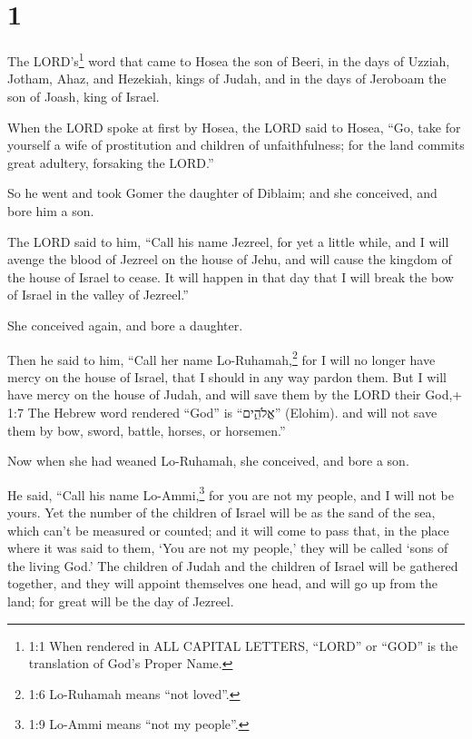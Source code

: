 \hypertarget{section}{%
\section{1}\label{section}}

 The LORD's\footnote{1:1 When rendered in ALL CAPITAL
  LETTERS, ``LORD'' or ``GOD'' is the translation of God's Proper Name.}
word that came to Hosea the son of Beeri, in the days of Uzziah, Jotham,
Ahaz, and Hezekiah, kings of Judah, and in the days of Jeroboam the son
of Joash, king of Israel.

 When the LORD spoke at first by Hosea, the LORD said to
Hosea, ``Go, take for yourself a wife of prostitution and children of
unfaithfulness; for the land commits great adultery, forsaking the
LORD.''

 So he went and took Gomer the daughter of Diblaim; and she
conceived, and bore him a son.

 The LORD said to him, ``Call his name Jezreel, for yet a
little while, and I will avenge the blood of Jezreel on the house of
Jehu, and will cause the kingdom of the house of Israel to cease.
 It will happen in that day that I will break the bow of
Israel in the valley of Jezreel.''

 She conceived again, and bore a daughter.

Then he said to him, ``Call her name Lo-Ruhamah,\footnote{1:6 Lo-Ruhamah
  means ``not loved''.} for I will no longer have mercy on the house of
Israel, that I should in any way pardon them.  But I will
have mercy on the house of Judah, and will save them by the LORD their
God,+ 1:7 The Hebrew word rendered ``God'' is ``אֱלֹהִ֑ים'' (Elohim).
and will not save them by bow, sword, battle, horses, or horsemen.''

 Now when she had weaned Lo-Ruhamah, she conceived, and bore
a son.

 He said, ``Call his name Lo-Ammi,\footnote{1:9 Lo-Ammi
  means ``not my people''.} for you are not my people, and I will not be
yours.  Yet the number of the children of Israel will be as
the sand of the sea, which can't be measured or counted; and it will
come to pass that, in the place where it was said to them, `You are not
my people,' they will be called `sons of the living God.' 
The children of Judah and the children of Israel will be gathered
together, and they will appoint themselves one head, and will go up from
the land; for great will be the day of Jezreel.


